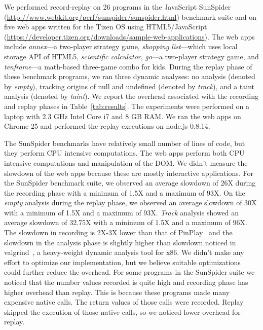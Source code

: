 \documentclass{sig-alternate}
\begin{document}
We performed record-replay on 26 programs in the JavaScript SunSpider
(\url{http://www.webkit.org/perf/sunspider/sunspider.html}) benchmark
suite and on five web apps written for the Tizen OS using
HTML5/JavaScript
(\url{https://developer.tizen.org/downloads/sample-web-applications}).
The web apps include \emph{annex}---a two-player strategy game,
\emph{shopping list}---which uses local storage API of HTML5,
\emph{scientific calculator}, \emph{go}---a two-player strategy game,
and \emph{tenframe}---a math-based three-game combo for kids.  During
the replay phase of these benchmark programs, we ran three dynamic
analyses: no analysis (denoted by \emph{empty}), tracking origins of
null and undefined (denoted by \emph{track}), and a taint analysis
(denoted by \emph{taint}).  We report the overhead associated with the
recording and replay phases in Table~\ref{tab:results}.  %
The experiments were performed on a laptop with 2.3 GHz Intel Core i7
and 8 GB RAM.  We ran the web apps on Chrome 25 and performed the
replay executions on node.js 0.8.14.

The SunSpider benchmarks have relatively small number of lines of
code, but they perform CPU intensive computations.  The web apps
perform both CPU intensive computations and manipulation of the DOM.
We didn't measure the slowdown of the web apps because these are
mostly interactive applications.  For the SunSpider benchmark suite,
we observed an average slowdown of 26X during the recording phase with
a minimum of 1.5X and a maximum of 93X.  On the \emph{empty} analysis
during the replay phase, we observed an average slowdown of 30X with a
minimum of 1.5X and a maximum of 93X.  \emph{Track} analysis showed an
average slowdown of 32.75X with a minimum of 1.5X and a maximum of
96X.  The slowdown in recording is 2X-3X lower than that of
PinPlay~\cite{Patil:2010:PFD:1772954.1772958} and the slowdown in the
analysis phase is slightly higher than slowdown noticed in
valgrind~\cite{Nethercote:2007:VFH:1250734.1250746}, a heavy-weight
dynamic analysis tool for x86.  We didn't make any effort to optimize
our implementation, but we believe suitable optimizations could
further reduce the overhead.  For some programs in the SunSpider suite
we noticed that the number values recorded is quite high and recording
phase has higher overhead than replay.  This is because these programs
made many expensive native calls.  The return values of those calls
were recorded.  Replay skipped the execution of those native calls, so
we noticed lower overhead for replay.
\end{document}

